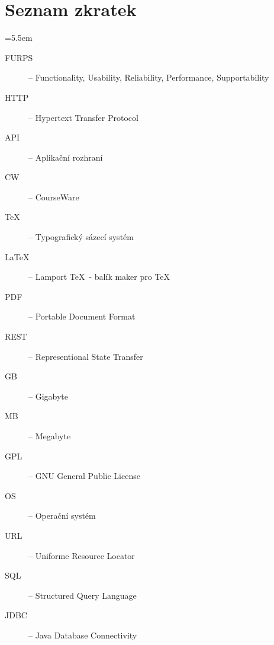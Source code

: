 \appendix

\chapter{Seznam zkratek}

\medskip
\bgroup \leftskip=5.5em

\begin{description}
	
	\item[FURPS] -- Functionality, Usability, Reliability, Performance, Supportability
	
	\item[HTTP] -- Hypertext Transfer Protocol
	
	\item[API] -- Aplikační rozhraní
	
	\item[CW] -- CourseWare
	
	\item[\TeX] -- Typografický sázecí systém
	
	\item[\LaTeX] -- Lamport \TeX\ - balík maker pro \TeX
	
	\item[PDF] -- Portable Document Format
	
	\item[REST] -- Representional State Transfer
	
	\item[GB] -- Gigabyte
	
	\item[MB] -- Megabyte
	
	\item[GPL] -- GNU General Public License
	
	\item[OS] -- Operační systém
	
	\item[URL] -- Uniforme Resource Locator 
	
	\item[SQL] -- Structured Query Language
	
	\item[JDBC] -- Java Database Connectivity
	
	

\end{description}

\par\egroup